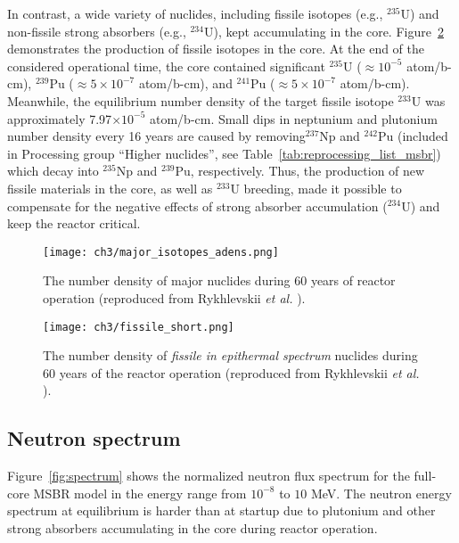 In contrast, a wide variety of nuclides, including fissile isotopes (e.g.,  
$^{235}$U) and non-fissile strong absorbers (e.g., $^{234}$U), kept 
accumulating in the core. Figure~\ref{fig:fissile_short} demonstrates the 
production of fissile isotopes in the core. At the end of the considered 
operational time, the core contained significant $^{235}$U ($\approx10^{-5}$ 
atom/b-cm), $^{239}$Pu ($\approx5\times10^{-7}$ atom/b-cm), and $^{241}$Pu 
($\approx 5\times10^{-7}$ atom/b-cm). Meanwhile, the equilibrium number 
density of the target fissile isotope $^{233}$U was approximately 
7.97$\times10^{-5}$ atom/b-cm. Small dips in neptunium and plutonium number 
density every 16 years are caused by removing$^{237}$Np and $^{242}$Pu 
(included in Processing group ``Higher nuclides'', see 
Table~\ref{tab:reprocessing_list_msbr}) which decay into $^{235}$Np and 
$^{239}$Pu, respectively. Thus, the production of new fissile materials in the 
core, as well as $^{233}$U breeding, made it possible to compensate for the 
negative effects of strong absorber accumulation ($^{234}$U) and keep the 
reactor critical.
\begin{figure}[ht!] %
	\centering
	\texttt{[image: ch3/major\_isotopes\_adens.png]}
	\caption{The number density of major nuclides during 60 years of reactor 
		operation (reproduced from Rykhlevskii \emph{et al.}  
		\cite{rykhlevskii_modeling_2019}).}
	\label{fig:adens_eq}
\end{figure}
\begin{figure}[t] %
	\centering
	\texttt{[image: ch3/fissile\_short.png]}
	\vspace{-6mm}
	\caption{The number density of \emph{fissile in epithermal spectrum} 
	nuclides during 60 years of the reactor operation (reproduced from 
		Rykhlevskii \emph{et al.} \cite{rykhlevskii_modeling_2019}).}
	\label{fig:fissile_short}
\end{figure}
\FloatBarrier

\subsection{Neutron spectrum}
Figure~\ref{fig:spectrum} shows the normalized neutron flux spectrum for the 
full-core \gls{MSBR} model in the energy range from $10^{-8}$ to $10$ MeV. The 
neutron energy spectrum at equilibrium is harder than at startup due to 
plutonium and other strong absorbers accumulating in the core during reactor 
operation.  

